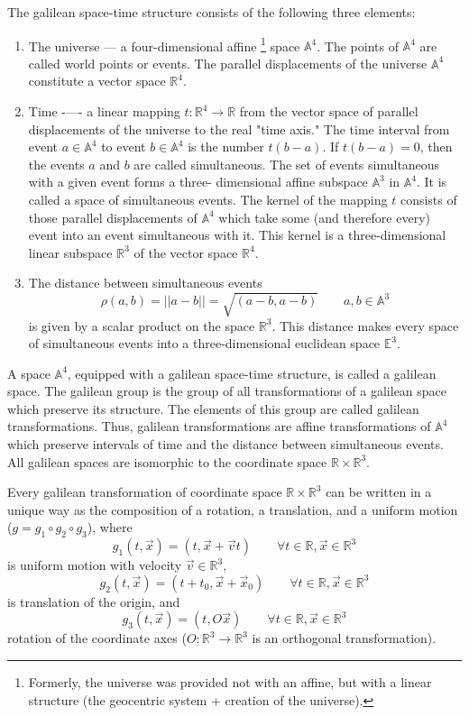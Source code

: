 \documentclass[11pt]{report}
\begin{document}
The galilean space-time structure consists of the following three elements:
\begin{enumerate}
    \item The universe --- a four-dimensional affine \footnote{Formerly, the universe was provided not with an affine, but with a linear structure (the geocentric system + creation of the universe).} space $\mathbb{A}^4$. 
        The points of $\mathbb{A}^4$ are called world points or events. 
        The parallel displacements of the universe $\mathbb{A}^4$
        constitute a vector space $\mathbb{R}^4$.
    \item Time -—- a linear mapping $t: \mathbb{R}^4 \rightarrow \mathbb{R}$ 
        from the vector space of parallel displacements of the 
        universe to the real "time axis." 
        The time interval from event $a \in \mathbb{A}^4$ 
        to event $b \in \mathbb{A}^4$ is the number $t(b - a)$. 
        If $t(b - a) = 0$, then the events $a$ and $b$ are called simultaneous.
The set of events simultaneous with a given event forms a three-
dimensional affine subspace $\mathbb{A}^3$ in $\mathbb{A}^4$. 
        It is called a space of simultaneous events.
The kernel of the mapping $t$ consists of those parallel displacements of
 $\mathbb{A}^4$ which take some (and therefore every) event into an event simultaneous
with it. This kernel is a three-dimensional linear subspace $\mathbb{R}^3$ of the vector
space $\mathbb{R}^4$.
\item The distance between simultaneous events
    \[\rho(a, b) = ||a - b|| =\sqrt{(a - b,a - b)}\qquad a,b \in \mathbb{A}^3 \]
is given by a scalar product on the space $\mathbb{R}^3$. This distance makes every
space of simultaneous events into a three-dimensional euclidean space $\mathbb{E}^3$.
\end{enumerate}

A space $\mathbb{A}^4$, equipped with a galilean space-time structure, is called a
galilean space. The galilean group is the group of all transformations of a galilean space
which preserve its structure. The elements of this group are called galilean
transformations. Thus, galilean transformations are affine transformations
of $\mathbb{A}^4$ which preserve intervals of time and the distance between simultaneous
events. All galilean spaces are isomorphic to the coordinate space $\mathbb{R} \times \mathbb{R}^3$.

Every galilean transformation of  coordinate space $\mathbb{R} \times \mathbb{R}^3$
can be written in a unique way as the composition of a rotation, a translation,
and a uniform motion ($g = g_1 \circ g_2 \circ g_3$), where
\[g_1(t,\vec x)=(t,\vec x+\vec v t)\qquad \forall t\in \mathbb{R},\vec x \in\mathbb{R}^3\] is uniform motion with velocity $\vec v \in\mathbb{R}^3$,
\[g_2(t,\vec x)=(t+t_0,\vec x+\vec x_0)\qquad \forall t\in \mathbb{R},\vec x \in\mathbb{R}^3\] is translation of the origin, and
\[g_3(t,\vec x)=(t,O\vec x)\qquad \forall t\in \mathbb{R},\vec x \in\mathbb{R}^3\] rotation of the coordinate axes ($O:\mathbb{R}^3 \rightarrow \mathbb{R}^3$ is an orthogonal transformation).
\end{document}
